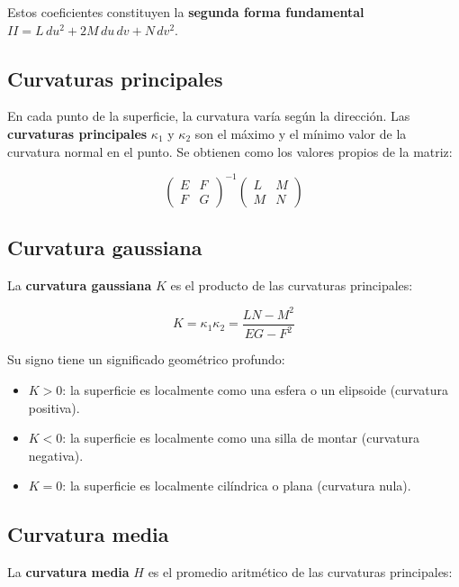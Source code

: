 \documentclass[
]{book}
\providecommand{\tightlist}{%
  \setlength{\itemsep}{0pt}\setlength{\parskip}{0pt}}
\begin{document}
Estos coeficientes constituyen la \textbf{segunda forma fundamental} \(II = L\,du^2 + 2M\,du\,dv + N\,dv^2\).

\subsection{Curvaturas principales}\label{curvaturas-principales}

En cada punto de la superficie, la curvatura varía según la dirección. Las \textbf{curvaturas principales} \(\kappa_1\) y \(\kappa_2\) son el máximo y el mínimo valor de la curvatura normal en el punto. Se obtienen como los valores propios de la matriz:

\[
\begin{pmatrix}
E & F \\
F & G
\end{pmatrix}^{-1}
\begin{pmatrix}
L & M \\
M & N
\end{pmatrix}
\]

\subsection{Curvatura gaussiana}\label{curvatura-gaussiana}

La \textbf{curvatura gaussiana} \(K\) es el producto de las curvaturas principales:

\[
K = \kappa_1 \kappa_2 = \frac{LN - M^2}{EG - F^2}
\]

Su signo tiene un significado geométrico profundo:

\begin{itemize}
\tightlist
\item
  \(K > 0\): la superficie es localmente como una esfera o un elipsoide (curvatura positiva).
\item
  \(K < 0\): la superficie es localmente como una silla de montar (curvatura negativa).
\item
  \(K = 0\): la superficie es localmente cilíndrica o plana (curvatura nula).
\end{itemize}

\subsection{Curvatura media}\label{curvatura-media}

La \textbf{curvatura media} \(H\) es el promedio aritmético de las curvaturas principales:
\end{document}
